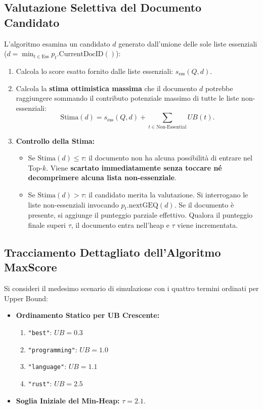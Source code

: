 \subsection{Valutazione Selettiva del Documento Candidato}
L'algoritmo esamina un candidato $d$ generato dall'unione delle sole liste essenziali ($d = \min_{t \in \text{Ess}} p_t.\text{CurrentDocID}()$):
\begin{enumerate}
    \item Calcola lo score esatto fornito dalle liste essenziali: $s_{\text{ess}}(Q, d)$.
    \item Calcola la \textbf{stima ottimistica massima} che il documento $d$ potrebbe raggiungere sommando il contributo potenziale massimo di tutte le liste non-essenziali:
    \begin{equation}
        \text{Stima}(d) = s_{\text{ess}}(Q, d) + \sum_{t \in \text{Non-Essential}} UB(t).
        \label{eq:maxscore-stima}
    \end{equation}
    \item \textbf{Controllo della Stima:}
    \begin{itemize}
        \item Se $\text{Stima}(d) \le \tau$: il documento non ha alcuna possibilit\`a di entrare nel Top-$k$. Viene \textbf{scartato immediatamente senza toccare n\'e decomprimere alcuna lista non-essenziale}.
        \item Se $\text{Stima}(d) > \tau$: il candidato merita la valutazione. Si interrogano le liste non-essenziali invocando $p_t.\text{nextGEQ}(d)$. Se il documento \`e presente, si aggiunge il punteggio parziale effettivo. Qualora il punteggio finale superi $\tau$, il documento entra nell'heap e $\tau$ viene incrementata.
    \end{itemize}
\end{enumerate}

\FloatBarrier
\subsection{Tracciamento Dettagliato dell'Algoritmo MaxScore}
\label{subsec:tracciamento-maxscore}
Si consideri il medesimo scenario di simulazione con i quattro termini ordinati per Upper Bound:
\begin{itemize}
    \item \textbf{Ordinamento Statico per UB Crescente:}
    \begin{enumerate}
        \item \texttt{"best"}: $UB = 0.3$
        \item \texttt{"programming"}: $UB = 1.0$
        \item \texttt{"language"}: $UB = 1.1$
        \item \texttt{"rust"}: $UB = 2.5$
    \end{enumerate}
    \item \textbf{Soglia Iniziale del Min-Heap:} $\tau = 2.1$.
\end{itemize}

